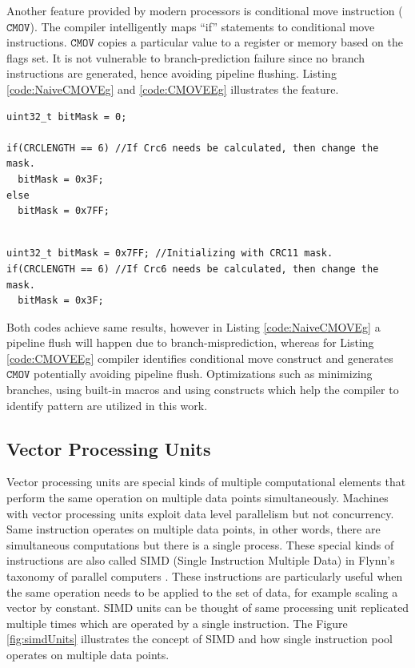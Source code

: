 Another feature provided by modern processors is conditional move instruction ($\mathtt{CMOV}$). The compiler intelligently maps ``if'' statements to conditional move instructions. $\mathtt{CMOV}$ copies a particular value to a register or memory based on the flags set. It is not vulnerable to branch-prediction failure since no branch instructions are generated, hence avoiding pipeline flushing. Listing \ref{code:NaiveCMOVEg} and \ref{code:CMOVEEg} illustrates the feature.

\begin{code}
	\label{code:NaiveCMOVEg}
\begin{verbatim}
uint32_t bitMask = 0;

if(CRCLENGTH == 6) //If Crc6 needs be calculated, then change the mask.
  bitMask = 0x3F;
else
  bitMask = 0x7FF;
  
\end{verbatim}
\end{code}

\begin{code}
	\label{code:CMOVEEg}
\begin{verbatim}
uint32_t bitMask = 0x7FF; //Initializing with CRC11 mask.
if(CRCLENGTH == 6) //If Crc6 needs be calculated, then change the mask.
  bitMask = 0x3F;
\end{verbatim}
\end{code}

Both codes achieve same results, however in Listing \ref{code:NaiveCMOVEg} a pipeline flush will happen due to branch-misprediction, whereas for Listing \ref{code:CMOVEEg} compiler identifies conditional move construct and generates $\mathtt{CMOV}$ potentially avoiding pipeline flush. Optimizations such as minimizing branches, using built-in macros and using constructs which help the compiler to identify pattern are utilized in this work.

\subsection{Vector Processing Units}
Vector processing units are special kinds of multiple computational elements that perform the same operation on multiple data points simultaneously. Machines with vector processing units exploit data level parallelism but not concurrency. Same instruction operates on multiple data points, in other words, there are simultaneous computations but there is a single process. These special kinds of instructions are also called SIMD (Single Instruction Multiple Data) in Flynn's taxonomy of parallel computers \cite{Hennessy}. These instructions are particularly useful when the same operation needs to be applied to the set of data, for example scaling a vector by constant. SIMD units can be thought of same processing unit replicated multiple times which are operated by a single instruction. The Figure \ref{fig:simdUnits} illustrates the concept of SIMD and how single instruction pool operates on multiple data points.

